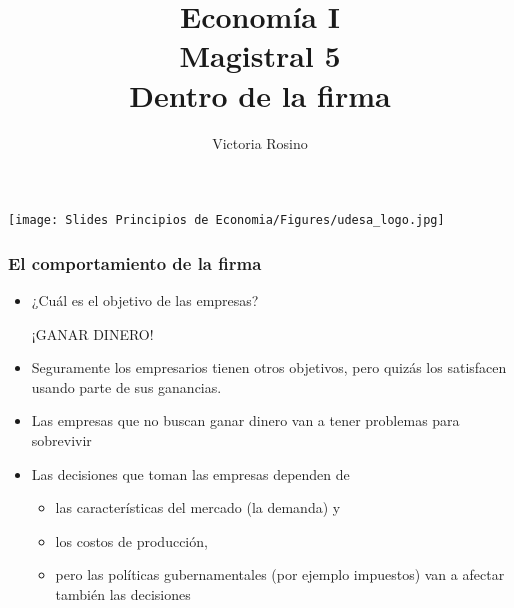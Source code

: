 \documentclass{beamer}
\title[Economía I]{Economía I \vspace{3mm}
\\ Magistral 5 \vspace{3mm} \\ Dentro de la firma}
\date{}
\author[Victoria Rosino]{Victoria Rosino}
\institute[]{Universidad de San Andrés}
\begin{document}
\begin{frame}
\vspace{0.3cm}
\titlepage
\centering
\vspace{-0.9cm}
\texttt{[image: Slides Principios de Economia/Figures/udesa\_logo.jpg]} 
\end{frame}

\begin{frame}
\frametitle{El comportamiento de la firma}
\begin{itemize}
    \item ¿Cuál es el objetivo de las empresas? \vspace{2mm}
    \begin{center}
        ¡GANAR DINERO!
    \end{center}  \vspace{2mm}
     \item Seguramente los empresarios tienen otros objetivos, pero quizás los satisfacen usando parte de sus ganancias. 
     \item Las empresas que no buscan ganar dinero van a tener problemas para sobrevivir 
    \item Las decisiones que toman las empresas dependen de 
    \begin{itemize}
        \item las características del mercado (la demanda) y
        \item los costos de producción, 
        \item pero las políticas gubernamentales (por ejemplo impuestos) van a afectar también las decisiones
    \end{itemize}    
\end{itemize}    
\end{frame}
\end{document}

